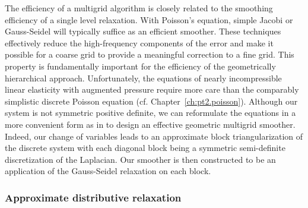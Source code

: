 The efficiency of a multigrid algorithm is closely related to the smoothing efficiency of a single level relaxation. With Poisson's equation, simple Jacobi or Gauss-Seidel will typically suffice as an efficient smoother. These techniques effectively reduce the high-frequency components of the error and make it possible for a coarse grid to provide a meaningful correction to a fine grid. This property is fundamentally important for the efficiency of the geometrically hierarchical approach. Unfortunately, the equations of nearly incompressible linear elasticity with augmented pressure require more care than the comparably simplistic discrete Poisson equation (cf. Chapter~\ref{ch:pt2.poisson}). Although our system is not symmetric positive definite, we can reformulate the equations in a more convenient form as in \cite{Zhu.Yongning10} to design an effective geometric multigrid smoother. Indeed, our change of variables leads to an approximate block triangularization of the discrete system with each diagonal block being a symmetric semi-definite discretization of the Laplacian. Our smoother is then constructed to be an application of the Gauss-Seidel relaxation on each block.

\subsubsection{Approximate distributive relaxation} \label{subsubsec:relaxation.distributive}

